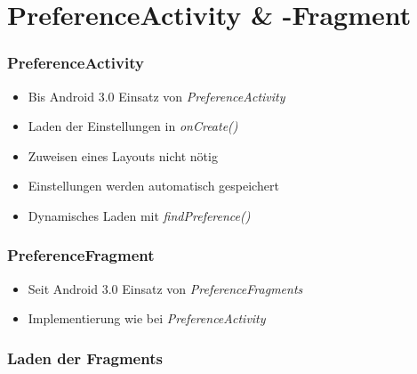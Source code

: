 \section{PreferenceActivity \& -Fragment}
\begin{frame}
   \frametitle{PreferenceActivity}
   \begin{itemize}
      \item Bis Android 3.0 Einsatz von \emph{PreferenceActivity}
      \item Laden der Einstellungen in \emph{onCreate()}
      \item Zuweisen eines Layouts nicht nötig
      \item Einstellungen werden automatisch gespeichert
      \item Dynamisches Laden mit \emph{findPreference()}
   \end{itemize}

   
\end{frame}

\begin{frame}
   \frametitle{PreferenceFragment}
   \begin{itemize}
      \item Seit Android 3.0 Einsatz von \emph{PreferenceFragments}
      \item Implementierung wie bei \emph{PreferenceActivity}
   \end{itemize}

   
\end{frame}

\begin{frame}
   \frametitle{Laden der Fragments}
   
\end{frame}

